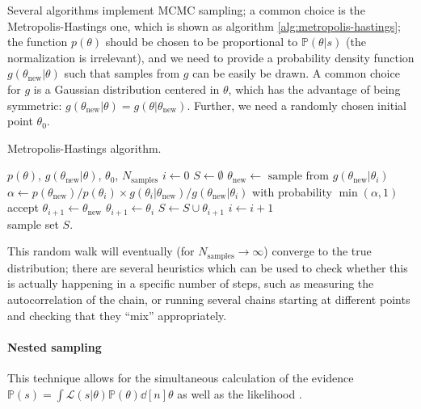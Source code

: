 \documentclass[main.tex]{subfiles}
\begin{document}
Several algorithms implement \ac{MCMC} sampling; a common choice is the Metropolis-Hastings one, which is shown as algorithm \ref{alg:metropolis-hastings}; the function \(p(\theta )\) should be chosen to be proportional to \(\mathbb{P}(\theta | s)\) (the normalization is irrelevant), and we need to provide a probability density function \(g(\theta _{\text{new}}  | \theta  )\) such that samples from \(g\) can be easily be drawn. A common choice for \(g\) is a Gaussian distribution centered in \(\theta \), which has the advantage of being symmetric: \(g( \theta _{\text{new}}| \theta ) = g (\theta | \theta _{\text{new}})\).
Further, we need a randomly chosen initial point \(\theta_0 \).

\begin{algorithm}
\caption{Metropolis-Hastings algorithm. }\label{alg:metropolis-hastings}
\begin{algorithmic}
\Require $p(\theta )$, \(g(\theta _{\text{new}} | \theta  )\), \(\theta_0 \), \(N _{\text{samples}}\)
\State $i \gets 0$
\State $S \gets \emptyset$ 
\State \(\theta _{\text{new}} \gets \text{ sample from } g(\theta _{\text{new}} | \theta_{i})\)
\State \(\alpha \gets p(\theta _{\text{new}}) / p(\theta_i) \times g(\theta _i | \theta _{\text{new}}) / g(\theta _{\text{new}} | \theta_i)\) 
\State with probability \(\min(\alpha, 1) \) accept
    \State $\theta_{i+1} \gets \theta  _{\text{new}}$
\Else
    \State $\theta _{i+1} \gets \theta _i$
\EndIf
\State \(S \gets S \cup \theta_{i+1}\)
\State \(i \gets i+1\)
\EndWhile \\
\Return sample set \(S\). 
\end{algorithmic}
\end{algorithm}

This random walk will eventually (for \(N _{\text{samples}} \to \infty \)) converge to the true distribution; there are several heuristics which can be used to check whether this is actually happening in a specific number of steps, such as measuring the autocorrelation of the chain, or running several chains starting at different points and checking that they ``mix'' appropriately. 

\paragraph{Nested sampling}

This technique allows for the simultaneous calculation of the evidence \(\mathbb{P}(s) = \int \mathscr{L}(s|\theta) \mathbb{P}(\theta ) \dd[n]{\theta }\) as well as the likelihood \cites{skillingNestedSamplingGeneral2006}{siviaDataAnalysisBayesian2006}[app.\ B]{breschiTtBajesBayesian2021}{betancourtNestedSamplingConstrained2011}.
\end{document}
